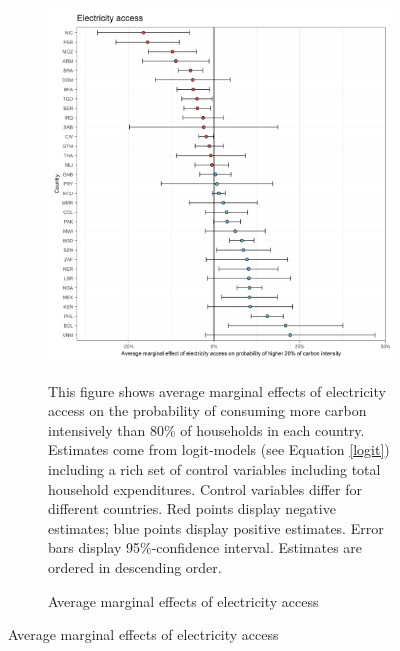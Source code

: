  \begin{figure}[ht!]\ContinuedFloat
   \centering
   \begin{subfigure}[b]{\textwidth}
   \centering
   \caption{Average marginal effects of electricity access} \label{fig:Logit_ME_electricity}
   \includegraphics{1_Figures/Analysis_Logit_Models_Marginal_Effects/Average_Marginal_Effects_affected_upper_80_electricity.access_2017.jpg}
   \begin{subcaption2}
     This figure shows average marginal effects of electricity access on the probability of consuming more carbon intensively than 80\% of households in each country. Estimates come from logit-models (see Equation \ref{logit}) including a rich set of control variables including total household expenditures. Control variables differ for different countries. Red points display negative estimates; blue points display positive estimates. Error bars display 95\%-confidence interval. Estimates are ordered in descending order.
   \end{subcaption2}
   \end{subfigure}
 \end{figure}
 \clearpage

